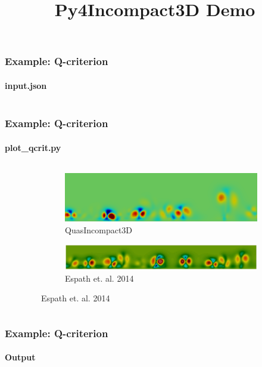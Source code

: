 \documentclass{beamer}
\title{Py4Incompact3D Demo}
\begin{document}
\maketitle

\begin{frame}
  \frametitle{Example: Q-criterion}
  \framesubtitle{input.json}

  \begin{columns}
    \begin{column}{0.49\textwidth}
      
    \end{column}
    \begin{column}{0.49\textwidth}
      
    \end{column}
  \end{columns}
\end{frame}
\begin{frame}
  \frametitle{Example: Q-criterion}
  \framesubtitle{plot\_qcrit.py}


  \begin{columns}
    \begin{column}{0.49\textwidth}
      
    \end{column}
    \begin{column}{0.49\textwidth}
      \begin{figure}[h!]
        \centering
        \begin{subfigure}[b]{0.99\textwidth}
          \includegraphics[width=\textwidth]{g0998-q-t8}
          \caption{QuasIncompact3D}
        \end{subfigure}
        \begin{subfigure}[b]{0.99\textwidth}
          \includegraphics[width=\textwidth]{boussinesq-q-t8}
          \caption{Espath et. al. 2014}
        \end{subfigure}
      \end{figure}
    \end{column}
  \end{columns}
\end{frame}
\begin{frame}
  \frametitle{Example: Q-criterion}
  \framesubtitle{Output}
  
\end{frame}
\end{document}
